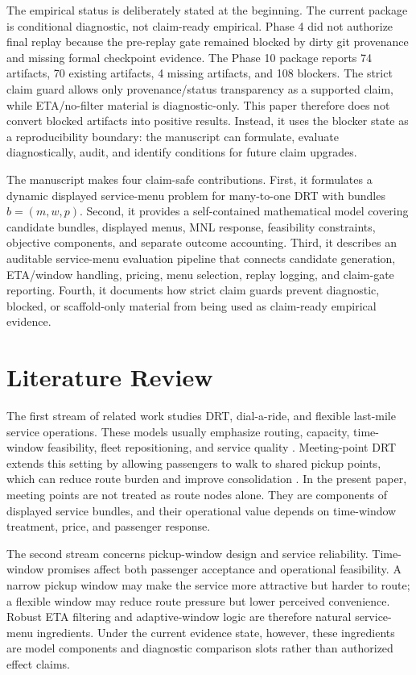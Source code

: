 \documentclass[a4paper,fleqn,review]{cas-dc}
\begin{document}
The empirical status is deliberately stated at the beginning. The current
package is conditional diagnostic, not claim-ready empirical. Phase 4 did not
authorize final replay because the pre-replay gate remained blocked by dirty
git provenance and missing formal checkpoint evidence. The Phase 10 package
reports 74 artifacts, 70 existing artifacts, 4 missing artifacts, and 108
blockers. The strict claim guard allows only provenance/status transparency as
a supported claim, while ETA/no-filter material is diagnostic-only. This paper
therefore does not convert blocked artifacts into positive results. Instead,
it uses the blocker state as a reproducibility boundary: the manuscript can
formulate, evaluate diagnostically, audit, and identify conditions for future
claim upgrades.

The manuscript makes four claim-safe contributions. First, it formulates a
dynamic displayed service-menu problem for many-to-one DRT with bundles
$b=(m,w,p)$. Second, it provides a self-contained mathematical model covering
candidate bundles, displayed menus, MNL response, feasibility constraints,
objective components, and separate outcome accounting. Third, it describes an
auditable service-menu evaluation pipeline that connects candidate generation,
ETA/window handling, pricing, menu selection, replay logging, and claim-gate
reporting. Fourth, it documents how strict claim guards prevent diagnostic,
blocked, or scaffold-only material from being used as claim-ready empirical
evidence.

\section{Literature Review}

The first stream of related work studies DRT, dial-a-ride, and flexible
last-mile service operations. These models usually emphasize routing,
capacity, time-window feasibility, fleet repositioning, and service quality
\citep{cordeau2007dial,parragh2008survey,ho2018survey}. Meeting-point DRT
extends this setting by allowing passengers to walk to shared pickup points,
which can reduce route burden and improve consolidation
\citep{stiglic2015benefits,zheng2019meeting,fielbaum2021ondemand,cortenbach2024}.
In the present paper, meeting points are not treated as route nodes alone.
They are components of displayed service bundles, and their operational value
depends on time-window treatment, price, and passenger response.

The second stream concerns pickup-window design and service reliability.
Time-window promises affect both passenger acceptance and operational
feasibility. A narrow pickup window may make the service more attractive but
harder to route; a flexible window may reduce route pressure but lower
perceived convenience. Robust ETA filtering and adaptive-window logic are
therefore natural service-menu ingredients. Under the current evidence state,
however, these ingredients are model components and diagnostic comparison
slots rather than authorized effect claims.
\end{document}
